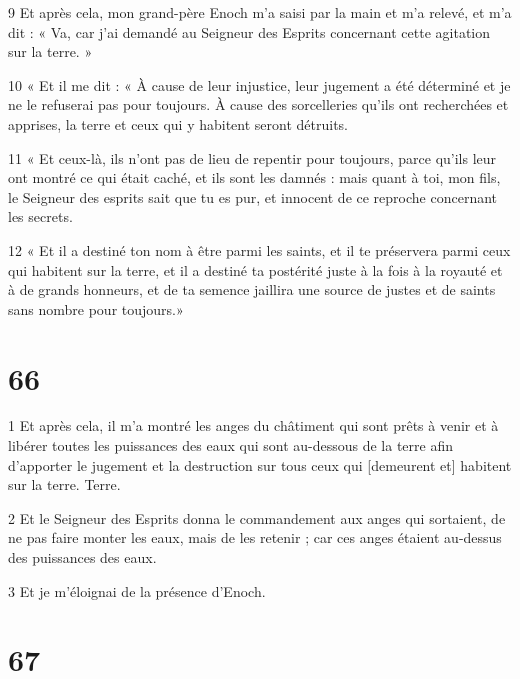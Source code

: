 \par 9 Et après cela, mon grand-père Enoch m'a saisi par la main et m'a relevé, et m'a dit : « Va, car j'ai demandé au Seigneur des Esprits concernant cette agitation sur la terre. »
\par 10 « Et il me dit : « À cause de leur injustice, leur jugement a été déterminé et je ne le refuserai pas pour toujours. À cause des sorcelleries qu’ils ont recherchées et apprises, la terre et ceux qui y habitent seront détruits.
\par 11 « Et ceux-là, ils n'ont pas de lieu de repentir pour toujours, parce qu'ils leur ont montré ce qui était caché, et ils sont les damnés : mais quant à toi, mon fils, le Seigneur des esprits sait que tu es pur, et innocent de ce reproche concernant les secrets.
\par 12 « Et il a destiné ton nom à être parmi les saints, et il te préservera parmi ceux qui habitent sur la terre, et il a destiné ta postérité juste à la fois à la royauté et à de grands honneurs, et de ta semence jaillira une source de justes et de saints sans nombre pour toujours.»

\chapter{66}

\par 1 Et après cela, il m'a montré les anges du châtiment qui sont prêts à venir et à libérer toutes les puissances des eaux qui sont au-dessous de la terre afin d'apporter le jugement et la destruction sur tous ceux qui [demeurent et] habitent sur la terre. Terre.
\par 2 Et le Seigneur des Esprits donna le commandement aux anges qui sortaient, de ne pas faire monter les eaux, mais de les retenir ; car ces anges étaient au-dessus des puissances des eaux.
\par 3 Et je m'éloignai de la présence d'Enoch.

\chapter{67}

